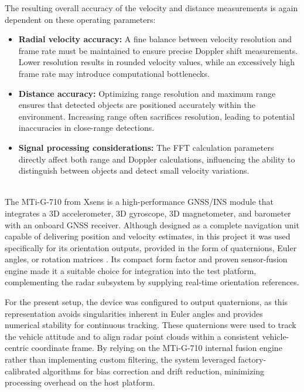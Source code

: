 The resulting overall accuracy of the velocity and distance measurements is again dependent on these operating parameters:
\begin{itemize}
\item \textbf{Radial velocity accuracy:} A fine balance between velocity resolution and frame rate must be maintained to ensure precise Doppler shift measurements. Lower resolution results in rounded velocity values, while an excessively high frame rate may introduce computational bottlenecks.
\item \textbf{Distance accuracy:} Optimizing range resolution and maximum range ensures that detected objects are positioned accurately within the environment. Increasing range often sacrifices resolution, leading to potential inaccuracies in close-range detections.
\item \textbf{Signal processing considerations:} The FFT calculation parameters directly affect both range and Doppler calculations, influencing the ability to distinguish between objects and detect small velocity variations.
\end{itemize}
\vspace{0.5em}
\hfill
\\
\indent The MTi-G-710 from Xsens is a high-performance GNSS/INS module that integrates a 3D accelerometer, 3D gyroscope, 3D magnetometer, and barometer with an onboard GNSS receiver.  
Although designed as a complete navigation unit capable of delivering position and velocity estimates, in this project it was used specifically for its orientation outputs, provided in the form of quaternions, Euler angles, or rotation matrices \cite{mti710_manual}.  
Its compact form factor and proven sensor-fusion engine made it a suitable choice for integration into the test platform, complementing the radar subsystem by supplying real-time orientation references.  

For the present setup, the device was configured to output quaternions, as this representation avoids singularities inherent in Euler angles and provides numerical stability for continuous tracking.  
These quaternions were used to track the vehicle attitude and to align radar point clouds within a consistent vehicle-centric coordinate frame.  
By relying on the MTi-G-710 internal fusion engine rather than implementing custom filtering, the system leveraged factory-calibrated algorithms for bias correction and drift reduction, minimizing processing overhead on the host platform.  

